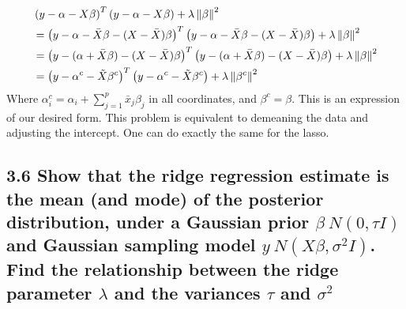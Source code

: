 \begin{align*}
   &\left(y - \alpha - X \beta\right)^T\left(y - \alpha - X \beta\right) + \lambda \left\lVert\beta\right\rVert^2\\ &=
   \left(y - \alpha - \bar{X} \beta - (X - \bar{X}) \beta\right)^T\left(y - \alpha - \bar{X} \beta - (X - \bar{X}) \beta\right) + \lambda \left\lVert\beta\right\rVert^2\\ &=
   \left(y - (\alpha + \bar{X} \beta) - (X - \bar{X}) \beta\right)^T\left(y - (\alpha + \bar{X} \beta) - (X - \bar{X}) \beta\right) + \lambda \left\lVert\beta\right\rVert^2\\ &=
   \left(y - \alpha^c - \tilde{X} \beta^c\right)^T\left(y - \alpha^c - \tilde{X} \beta^c\right) + \lambda \left\lVert\beta^c\right\rVert^2
\end{align*}
Where $\alpha^c_i = \alpha_i + \sum_{j = 1}^p \bar{x}_j \beta_j$ in all coordinates, and $\beta^c = \beta$. This is an expression of our desired form.
This problem is equivalent to demeaning the data and adjusting the intercept.
One can do exactly the same for the lasso.







\subsection*{3.6 Show that the ridge regression estimate is the mean (and mode) of the posterior distribution, under a Gaussian prior $\beta ~ N(0, \tau I)$ and Gaussian sampling model $y ~ N(X\beta, \sigma^2 I)$. Find the relationship between the ridge parameter $\lambda$ and the variances $\tau$ and $\sigma^2$}

